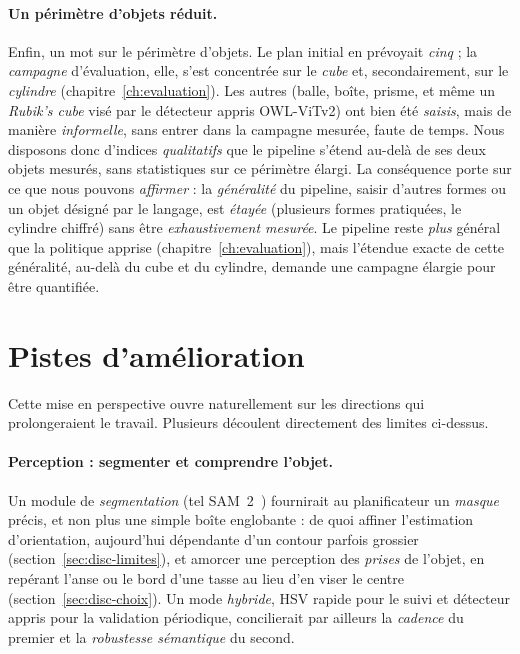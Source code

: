 \paragraph{Un périmètre d'objets réduit.}
Enfin, un mot sur le périmètre d'objets. Le plan initial en prévoyait \emph{cinq} ; la \emph{campagne} d'évaluation, elle, s'est concentrée sur le \emph{cube} et, secondairement, sur le \emph{cylindre} (chapitre~\ref{ch:evaluation}). Les autres (balle, boîte, prisme, et même un \emph{Rubik's cube} visé par le détecteur appris OWL-ViTv2) ont bien été \emph{saisis}, mais de manière \emph{informelle}, sans entrer dans la campagne mesurée, faute de temps. Nous disposons donc d'indices \emph{qualitatifs} que le pipeline s'étend au-delà de ses deux objets mesurés, sans statistiques sur ce périmètre élargi. La conséquence porte sur ce que nous pouvons \emph{affirmer} : la \emph{généralité} du pipeline, saisir d'autres formes ou un objet désigné par le langage, est \emph{étayée} (plusieurs formes pratiquées, le cylindre chiffré) sans être \emph{exhaustivement mesurée}. Le pipeline reste \emph{plus} général que la politique apprise (chapitre~\ref{ch:evaluation}), mais l'étendue exacte de cette généralité, au-delà du cube et du cylindre, demande une campagne élargie pour être quantifiée.

\section{Pistes d'amélioration}
\label{sec:disc-pistes}

Cette mise en perspective ouvre naturellement sur les directions qui prolongeraient le travail. Plusieurs découlent directement des limites ci-dessus.

\paragraph{Perception : segmenter et comprendre l'objet.}
Un module de \emph{segmentation} (tel SAM~2~\cite{ravi_sam2_2024}) fournirait au planificateur un \emph{masque} précis, et non plus une simple boîte englobante : de quoi affiner l'estimation d'orientation, aujourd'hui dépendante d'un contour parfois grossier (section~\ref{sec:disc-limites}), et amorcer une perception des \emph{prises} de l'objet, en repérant l'anse ou le bord d'une tasse au lieu d'en viser le centre (section~\ref{sec:disc-choix}). Un mode \emph{hybride}, HSV rapide pour le suivi et détecteur appris pour la validation périodique, concilierait par ailleurs la \emph{cadence} du premier et la \emph{robustesse sémantique} du second.

